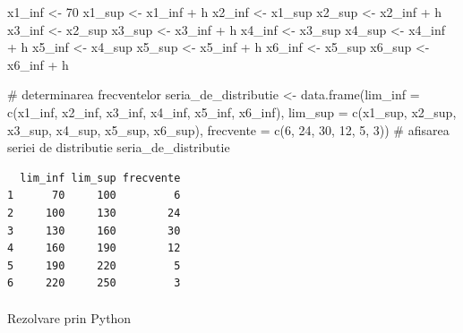 \documentclass[
  11pt,
  b5paper,
  nottoc]{book}
\makeatletter
\let\oldparagraph\paragraph
\renewcommand{\paragraph}{
    \@ifstar
      \xxxParagraphStar
      \xxxParagraphNoStar
  }
\newcommand{\xxxParagraphStar}[1]{\oldparagraph*{#1}\mbox{}}
\newcommand{\xxxParagraphNoStar}[1]{\oldparagraph{#1}\mbox{}}
\newenvironment{Shaded}{\begin{snugshade}}{\end{snugshade}}
\newcommand{\AttributeTok}[1]{\textcolor[rgb]{0.40,0.45,0.13}{#1}}
\newcommand{\CommentTok}[1]{\textcolor[rgb]{0.37,0.37,0.37}{#1}}
\newcommand{\DecValTok}[1]{\textcolor[rgb]{0.68,0.00,0.00}{#1}}
\newcommand{\FunctionTok}[1]{\textcolor[rgb]{0.28,0.35,0.67}{#1}}
\newcommand{\NormalTok}[1]{\textcolor[rgb]{0.00,0.23,0.31}{#1}}
\newcommand{\OtherTok}[1]{\textcolor[rgb]{0.00,0.23,0.31}{#1}}
\newcommand{\SpecialCharTok}[1]{\textcolor[rgb]{0.37,0.37,0.37}{#1}}
\makeatother
\begin{document}
\begin{Shaded}
\begin{Highlighting}[]
\NormalTok{x1\_inf }\OtherTok{\textless{}{-}} \DecValTok{70}
\NormalTok{x1\_sup }\OtherTok{\textless{}{-}}\NormalTok{ x1\_inf }\SpecialCharTok{+}\NormalTok{ h}
\NormalTok{x2\_inf }\OtherTok{\textless{}{-}}\NormalTok{ x1\_sup }
\NormalTok{x2\_sup }\OtherTok{\textless{}{-}}\NormalTok{ x2\_inf }\SpecialCharTok{+}\NormalTok{ h}
\NormalTok{x3\_inf }\OtherTok{\textless{}{-}}\NormalTok{ x2\_sup }
\NormalTok{x3\_sup }\OtherTok{\textless{}{-}}\NormalTok{ x3\_inf }\SpecialCharTok{+}\NormalTok{ h}
\NormalTok{x4\_inf }\OtherTok{\textless{}{-}}\NormalTok{ x3\_sup }
\NormalTok{x4\_sup }\OtherTok{\textless{}{-}}\NormalTok{ x4\_inf }\SpecialCharTok{+}\NormalTok{ h}
\NormalTok{x5\_inf }\OtherTok{\textless{}{-}}\NormalTok{ x4\_sup }
\NormalTok{x5\_sup }\OtherTok{\textless{}{-}}\NormalTok{ x5\_inf }\SpecialCharTok{+}\NormalTok{ h}
\NormalTok{x6\_inf }\OtherTok{\textless{}{-}}\NormalTok{ x5\_sup }
\NormalTok{x6\_sup }\OtherTok{\textless{}{-}}\NormalTok{ x6\_inf }\SpecialCharTok{+}\NormalTok{ h}

\CommentTok{\# determinarea frecventelor}
\NormalTok{seria\_de\_distributie }\OtherTok{\textless{}{-}} \FunctionTok{data.frame}\NormalTok{(}\AttributeTok{lim\_inf =} \FunctionTok{c}\NormalTok{(x1\_inf, x2\_inf, x3\_inf, }
\NormalTok{                                               x4\_inf, x5\_inf, x6\_inf), }
                                   \AttributeTok{lim\_sup =} \FunctionTok{c}\NormalTok{(x1\_sup, x2\_sup, x3\_sup, }
\NormalTok{                                               x4\_sup, x5\_sup, x6\_sup), }
                                   \AttributeTok{frecvente =} \FunctionTok{c}\NormalTok{(}\DecValTok{6}\NormalTok{, }\DecValTok{24}\NormalTok{, }\DecValTok{30}\NormalTok{, }\DecValTok{12}\NormalTok{, }\DecValTok{5}\NormalTok{, }\DecValTok{3}\NormalTok{))}
\CommentTok{\# afisarea seriei de distributie}
\NormalTok{seria\_de\_distributie }
\end{Highlighting}
\end{Shaded}

\begin{verbatim}
  lim_inf lim_sup frecvente
1      70     100         6
2     100     130        24
3     130     160        30
4     160     190        12
5     190     220         5
6     220     250         3
\end{verbatim}

\paragraph{Rezolvare prin Python}\label{rezolvare-prin-python-1}
\end{document}
